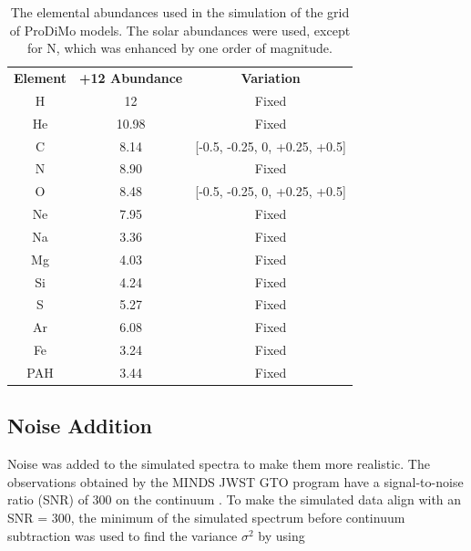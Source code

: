 \documentclass[oneside, single, authoryear, semicolon, 12pt]{lion-msc}
\newcommand{\4}{$_4$}
\newcommand{\3}{$_3$}
\newcommand{\2}{$_2$}
\begin{document}
\begin{table}[H]
\centering
\begin{tabular}{@{}ccc@{}}
                                  &                             &                            \\ \hline\midrule
\textbf{Element} & \textbf{+12 Abundance} & \textbf{Variation}            \\ \midrule
H                & 12                     & Fixed                         \\
He               & 10.98                 & Fixed                         \\
C                & 8.14                  & {[}-0.5, -0.25, 0, +0.25, +0.5{]} \\
N                & 8.90                  & Fixed                         \\
O                & 8.48                  & {[}-0.5, -0.25, 0, +0.25, +0.5{]} \\
Ne               & 7.95                  & Fixed                         \\
Na               & 3.36                  & Fixed                         \\
Mg               & 4.03                  & Fixed                         \\
Si               & 4.24                  & Fixed                         \\
S                & 5.27                  & Fixed                         \\
Ar               & 6.08                  & Fixed                         \\
Fe               & 3.24                  & Fixed                         \\
PAH              & 3.44                  & Fixed                         \\ \bottomrule
\end{tabular}
\caption{The elemental abundances used in the simulation of the grid of ProDiMo models. The solar abundances were used, except for N, which was enhanced by one order of magnitude.}
\label{tab: abundances}
\end{table}

\subsection{Noise Addition}
Noise was added to the simulated spectra to make them more realistic. The observations obtained by the MINDS JWST GTO program have a signal-to-noise ratio (SNR) of 300 on the continuum \citep{henning2024mindsjwstmirimidinfrared}. To make the simulated data align with an SNR = 300, the minimum of the simulated spectrum before continuum subtraction was used to find the variance $\sigma^2$ by using 
\end{document}
